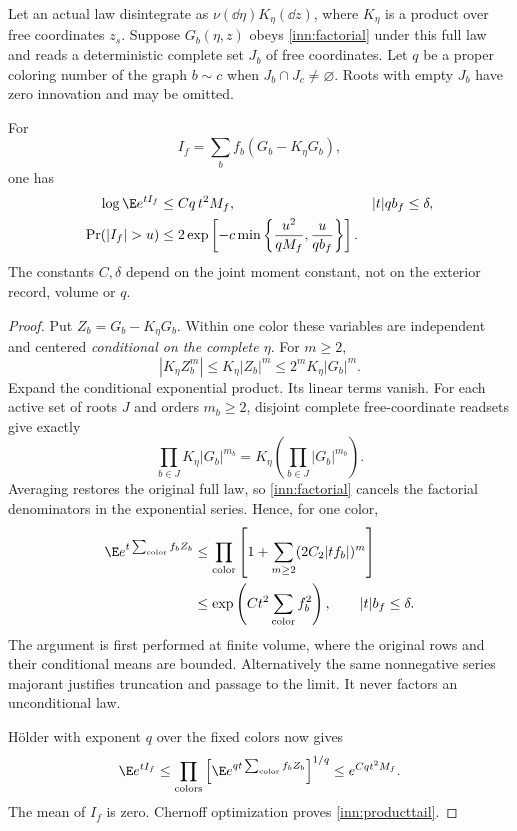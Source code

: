 \begin{theorem}
\label{inn:product}
Let an actual law disintegrate as $\nu(\dd\eta)K_\eta(\dd z)$, where $K_\eta$ is a product over free coordinates $z_s$. Suppose $G_b(\eta,z)$ obeys \eqref{inn:factorial} under this full law and reads a deterministic complete set $J_b$ of free coordinates. Let $q$ be a proper coloring number of the graph $b\sim c$ when $J_b\cap J_c\ne\varnothing$. Roots with empty $J_b$ have zero innovation and may be omitted.

For
\[
 I_f=\sum_bf_b(G_b-K_\eta G_b),
\]
one has
\begin{align}
 \log\E e^{tI_f}&\le Cq\,t^2M_f,
 && |t|q b_f\le\delta, \label{inn:productmgf}\\
 \Pr(|I_f|>u)&\le2\exp\left[-c\min\left\{
       \frac{u^2}{qM_f},\frac{u}{q b_f}\right\}\right].
 \label{inn:producttail}
\end{align}
The constants $C,\delta$ depend on the joint moment constant, not on the exterior record, volume or $q$.
\end{theorem}
\begin{proof}
Put $Z_b=G_b-K_\eta G_b$. Within one color these variables are independent and centered \emph{conditional on the complete $\eta$}. For $m\ge2$,
\[
 |K_\eta Z_b^m|\le K_\eta|Z_b|^m
 \le2^mK_\eta|G_b|^m.
\]
Expand the conditional exponential product. Its linear terms vanish. For each active set of roots $J$ and orders $m_b\ge2$, disjoint complete free-coordinate readsets give exactly
\[
 \prod_{b\in J}K_\eta|G_b|^{m_b}
 =K_\eta\left(\prod_{b\in J}|G_b|^{m_b}\right).
\]
Averaging restores the original full law, so \eqref{inn:factorial} cancels the factorial denominators in the exponential series. Hence, for one color,
\begin{align*}
 \E e^{t\sum_{\mathrm{color}}f_bZ_b}
 &\le\prod_{\mathrm{color}}
       \left[1+\sum_{m\ge2}(2C_2|tf_b|)^m\right]\\
 &\le\exp\left(Ct^2\sum_{\mathrm{color}}f_b^2\right),
 \qquad |t|b_f\le\delta.
\end{align*}
The argument is first performed at finite volume, where the original rows and their conditional means are bounded. Alternatively the same nonnegative series majorant justifies truncation and passage to the limit. It never factors an unconditional law.

H\"older with exponent $q$ over the fixed colors now gives
\[
 \E e^{tI_f}
 \le\prod_{\mathrm{colors}}
   \left[\E e^{qt\sum_{\mathrm{color}}f_bZ_b}\right]^{1/q}
 \le e^{Cqt^2M_f}.
\]
The mean of $I_f$ is zero. Chernoff optimization proves \eqref{inn:producttail}.
\end{proof}

